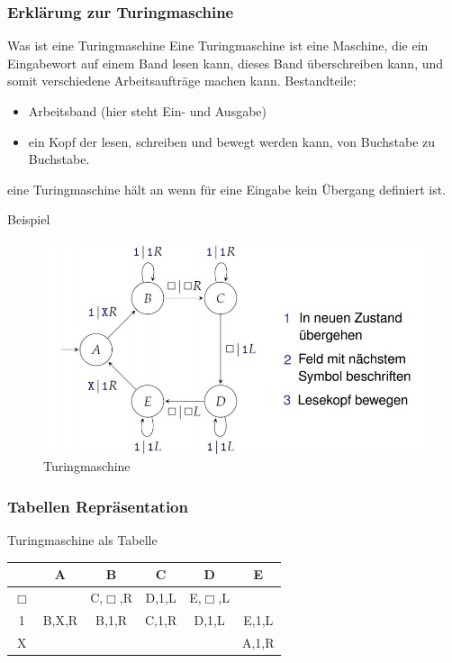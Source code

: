 \documentclass{beamer}
\begin{document}
\begin{frame}
	\frametitle{Erklärung zur Turingmaschine}
	\begin{block}{Was ist eine Turingmaschine}
		Eine Turingmaschine ist eine Maschine, die ein Eingabewort auf einem Band lesen kann, dieses Band überschreiben kann, und somit verschiedene Arbeitsaufträge machen kann.
		Bestandteile:
		\begin{itemize}
			\item Arbeitsband (hier steht Ein- und Ausgabe)
			\item ein Kopf der lesen, schreiben und bewegt werden kann, von Buchstabe zu Buchstabe.
		\end{itemize}
		eine Turingmaschine hält an wenn für eine Eingabe kein Übergang definiert ist.
	\end{block}
\end{frame}

\begin{frame}
	\begin{block}{Beispiel}
		\begin{figure}[H]
  			\centering
  			\includegraphics[width=\textwidth]{Turing1.jpg}
  			\caption{Turingmaschine}
  			\label{Turingmaschine}
		\end{figure}
	\end{block}
\end{frame}

\begin{frame}
	\frametitle{Tabellen Repräsentation}
	\begin{block}{Turingmaschine als Tabelle}
		\begin{tabular}{|c||c|c|c|c|c|}
			\hline
			  & A & B & C & D & E \\
			\hline
			\hline
			$\Box$ & & C,$\Box$,R & D,1,L & E,$\Box$,L & \\	
			\hline
			1 & B,X,R & B,1,R & C,1,R & D,1,L & E,1,L\\
			\hline
			X & & & & & A,1,R\\	
			\hline
		\end{tabular}
	\end{block}
\end{frame}
\end{document}
